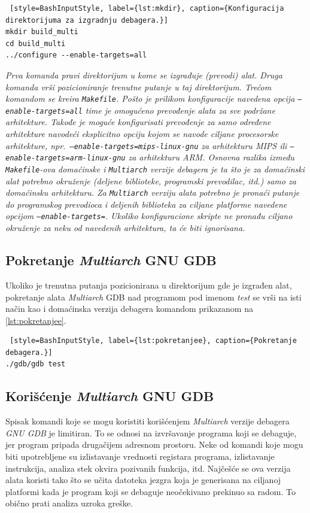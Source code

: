 \documentclass[12pt,oneside]{memoir}
\begin{document}
\begin{lstlisting} [style=BashInputStyle, label={lst:mkdir}, caption={Konfiguracija direktorijuma za izgradnju debagera.}]
mkdir build_multi
cd build_multi
../configure --enable-targets=all

\end{lstlisting}
\emph{Prva komanda pravi direktorijum u kome se izgrađuje (prevodi) alat. Druga komanda vrši pozicioniranje trenutne putanje u taj direktorijum. Trećom komandom se kreira \texttt{Makefile}. Pošto je prilikom konfiguracije navedena opcija \texttt{--enable-targets=all} time je omogućeno prevođenje alata za sve podržane arhitekture. Takođe je moguće konfigurisati prevođenje za samo određene arhitekture navodeći eksplicitno opciju kojom se navode ciljane procesorske arhitekture, npr.~\texttt{–enable-targets=mips-linux-gnu} za arhitekturu \emph{MIPS} ili \texttt{–enable-targets=arm-linux-gnu} za arhitekturu \emph{ARM}. Osnovna razlika između \texttt{Makefile}-ova domaćinske i \texttt{Multiarch} verzije debagera je ta što je za domaćinski alat potrebno okruženje (deljene biblioteke, programski prevodilac, itd.) samo za domaćinsku arhitekturu. Za \texttt{Multiarch} verziju alata potrebno je pronaći putanje do programskog prevodioca i deljenih biblioteka za ciljane platforme navedene opcijom \texttt{--enable-targets=}. Ukoliko konfiguracione skripte ne pronađu ciljano okruženje za neku od navedenih arhitektura, ta će biti ignorisana.}

\subsection{Pokretanje \emph{Multiarch} GNU GDB}

Ukoliko je trenutna putanja pozicionirana u direktorijum gde je izgrađen alat, pokretanje alata \emph{Multiarch} GDB nad programom pod imenom \emph{test} se vrši na isti način kao i domaćinska verzija debagera komandom prikazanom na \ref{lst:pokretanjee}.
\begin{lstlisting} [style=BashInputStyle, label={lst:pokretanjee}, caption={Pokretanje debagera.}]
./gdb/gdb test

\end{lstlisting}

\subsection{Korišćenje \emph{Multiarch} GNU GDB}

Spisak komandi koje se mogu koristiti korišćenjem \emph{Multiarch} verzije debagera \emph{GNU GDB} je limitiran. To se odnosi na izvršavanje programa koji se debaguje, jer program pripada drugačijem adresnom prostoru. Neke od komandi koje mogu biti upotrebljene su izlistavanje vrednosti registara programa, izlistavanje instrukcija, analiza stek okvira pozivanih funkcija, itd. Najčešće se ova verzija alata koristi tako što se učita datoteka jezgra koja je generisana na ciljanoj platformi kada je program koji se debaguje neočekivano prekinuo sa radom. To obično prati analiza uzroka greške.
\end{document}
